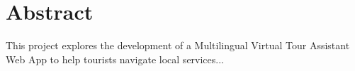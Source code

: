 \chapter*{Abstract}
This project explores the development of a Multilingual Virtual Tour Assistant Web App to help tourists navigate local services...

